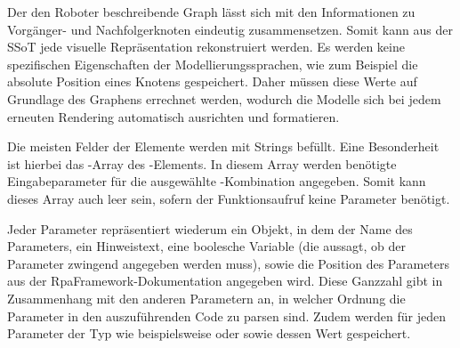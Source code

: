 Der den Roboter beschreibende Graph lässt sich mit den Informationen zu Vorgänger- und Nachfolgerknoten eindeutig zusammensetzen. Somit kann aus der SSoT jede visuelle Repräsentation rekonstruiert werden. Es werden keine spezifischen Eigenschaften der Modellierungssprachen, wie zum Beispiel die absolute Position eines Knotens gespeichert. Daher müssen diese Werte auf Grundlage des Graphens errechnet werden, wodurch die Modelle sich bei jedem erneuten Rendering automatisch ausrichten und formatieren.

Die meisten Felder der Elemente werden mit Strings befüllt. Eine Besonderheit ist hierbei das -Array des -Elements. In diesem Array werden benötigte Eingabeparameter für die ausgewählte -Kombination angegeben. Somit kann dieses Array auch leer sein, sofern der Funktionsaufruf keine Parameter benötigt. 

\label{parameterProps}
Jeder Parameter repräsentiert wiederum ein Objekt, in dem der Name des Parameters, ein Hinweistext, eine boolesche Variable (die aussagt, ob der Parameter zwingend angegeben werden muss), sowie die Position des Parameters aus der RpaFramework-Dokumentation angegeben wird. Diese Ganzzahl gibt in Zusammenhang mit den anderen Parametern an, in welcher Ordnung die Parameter in den auszuführenden Code zu parsen sind.
Zudem werden für jeden Parameter der Typ wie beispielsweise  oder  sowie dessen Wert gespeichert.